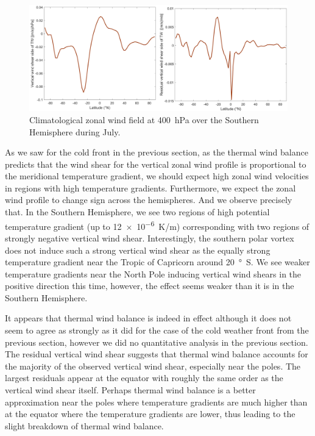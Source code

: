 \documentclass[11pt]{article}
\begin{document}
\begin{figure}[h!]
	\centering
	\includegraphics[width=\textwidth]{vertical_wind_shear.png}
	\caption{Climatological zonal wind field at \SI{400}{\hecto\Pa} over the Southern Hemisphere during July.}
	\label{fig:vertical_wind_shear_climo}
\end{figure}

As we saw for the cold front in the previous section, as the thermal wind balance predicts that the wind shear for the vertical zonal wind profile is proportional to the meridional temperature gradient, we should expect high zonal wind velocities in regions with high temperature gradients. Furthermore, we expect the zonal wind profile to change sign across the hemispheres. And we observe precisely that. In the Southern Hemisphere, we see two regions of high potential temperature gradient (up to \SI{12e-6}{\K/\m}) corresponding with two regions of strongly negative vertical wind shear. Interestingly, the southern polar vortex does not induce such a strong vertical wind shear as the equally strong temperature gradient near the Tropic of Capricorn around \SI{20}{\degree S}. We see weaker temperature gradients near the North Pole inducing vertical wind shears in the positive direction this time, however, the effect seems weaker than it is in the Southern Hemisphere.

It appears that thermal wind balance is indeed in effect although it does not seem to agree as strongly as it did for the case of the cold weather front from the previous section, however we did no quantitative analysis in the previous section. The residual vertical wind shear suggests that thermal wind balance accounts for the majority of the observed vertical wind shear, especially near the poles. The largest residuals appear at the equator with roughly the same order as the vertical wind shear itself. Perhaps thermal wind balance is a better approximation near the poles where temperature gradients are much higher than at the equator where the temperature gradients are lower, thus leading to the slight breakdown of thermal wind balance.
\end{document}

